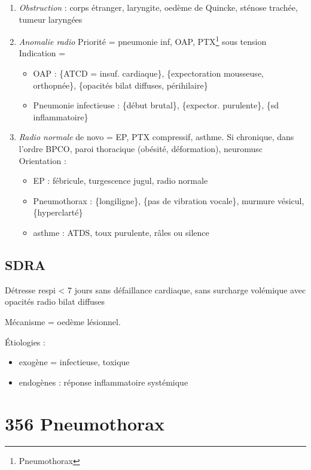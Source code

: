 \documentclass{book}
\begin{document}
\begin{enumerate}
\item \emph{Obstruction}  : corps étranger, laryngite, oedème de Quincke, sténose
trachée, tumeur laryngées
\item \emph{Anomalie radio} Priorité = pneumonie inf, OAP,
PTX\footnote{Pneumothorax} sous
tension\\
Indication =

\begin{itemize}
\item OAP : \{ATCD = insuf. cardiaque\}, \{expectoration mousseuse, orthopnée\},
\{opacités bilat diffuses, périhilaire\}
\item Pneumonie infectieuse : \{début brutal\}, \{expector. purulente\}, \{sd
inflammatoire\}
\end{itemize}

\item \emph{Radio normale} de novo = EP, PTX compressif, asthme. Si
chronique, dans l'ordre BPCO, paroi thoracique (obésité, déformation),
neuromusc\\
Orientation :

\begin{itemize}
\item EP : fébricule, turgescence jugul, radio normale
\item Pneumothorax : \{longiligne\}, \{pas de vibration vocale\}, murmure vésicul,
\{hyperclarté\}
\item asthme : ATDS, toux purulente, râles ou silence
\end{itemize}
\end{enumerate}

\subsection{SDRA}
\label{sec:org5cb12d1}
Détresse respi < 7 jours sans défaillance cardiaque, sans surcharge volémique
avec opacités radio bilat diffuses

Mécanisme = oedème lésionnel.

Étiologies :

\begin{itemize}
\item exogène = infectieuse, toxique
\item endogènes : réponse inflammatoire systémique
\end{itemize}


\section{356 \textdagger{} Pneumothorax}
\label{sec:orgf135db6}
\end{document}
